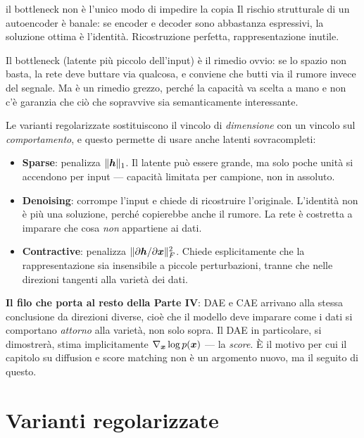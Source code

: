 \begin{intuizione}{il bottleneck non è l'unico modo di impedire la copia}
Il rischio strutturale di un autoencoder è banale: se encoder e decoder sono abbastanza espressivi, la soluzione ottima è l'identità. Ricostruzione perfetta, rappresentazione inutile.

Il bottleneck (latente più piccolo dell'input) è il rimedio ovvio: se lo spazio non basta, la rete deve buttare via qualcosa, e conviene che butti via il rumore invece del segnale. Ma è un rimedio grezzo, perché la capacità va scelta a mano e non c'è garanzia che ciò che sopravvive sia semanticamente interessante.

Le varianti regolarizzate sostituiscono il vincolo di \emph{dimensione} con un vincolo sul \emph{comportamento}, e questo permette di usare anche latenti sovracompleti:
\begin{itemize}[leftmargin=1.4em]
  \item \textbf{Sparse}: penalizza $\|\bm{h}\|_1$. Il latente può essere grande, ma solo poche unità si accendono per input — capacità limitata per campione, non in assoluto.
  \item \textbf{Denoising}: corrompe l'input e chiede di ricostruire l'originale. L'identità non è più una soluzione, perché copierebbe anche il rumore. La rete è costretta a imparare che cosa \emph{non} appartiene ai dati.
  \item \textbf{Contractive}: penalizza $\|\partial \bm{h}/\partial \bm{x}\|_F^2$. Chiede esplicitamente che la rappresentazione sia insensibile a piccole perturbazioni, tranne che nelle direzioni tangenti alla varietà dei dati.
\end{itemize}

\textbf{Il filo che porta al resto della Parte IV}: DAE e CAE arrivano alla stessa conclusione da direzioni diverse, cioè che il modello deve imparare come i dati si comportano \emph{attorno} alla varietà, non solo sopra. Il DAE in particolare, si dimostrerà, stima implicitamente $\nabla_{\bm{x}} \log p(\bm{x})$ — la \emph{score}. È il motivo per cui il capitolo su diffusion e score matching non è un argomento nuovo, ma il seguito di questo.
\end{intuizione}

\section{Varianti regolarizzate}

